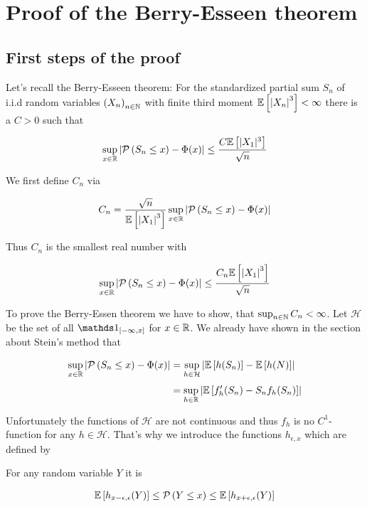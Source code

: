 \section{Proof of the Berry-Esseen theorem}

\subsection{First steps of the proof}

Let's recall the Berry-Esseen theorem: For the standardized partial sum $S_n$ of i.i.d random variables $\left({X_n}\right)_{{n}\in\mathbb N}$ with finite third moment $\mathbb E\left[{\left|{X_n}\right|^3}\right]<\infty$ there is a $C > 0$ such that

\begin{align}
  \sup_{x\in\mathbb R} \left|{\mathcal P\left({S_n\le x}\right)-\Phi(x)}\right| \le \frac{C \mathbb E\left[{|X_1|^3}\right]}{\sqrt n}
\end{align}

\noindent We first define $C_n$ via

\begin{align}
  C_n = \frac{\sqrt{n}}{\mathbb E\left[{\left|{X_1}\right|^3}\right]} \sup_{x\in\mathbb R} \left|{\mathcal P\left({S_n \le x}\right)-\Phi(x)}\right|
\end{align}

\noindent Thus $C_n$ is the smallest real number with

\begin{align}
  \sup_{x\in\mathbb R}\left|{\mathcal P\left({S_n\le x}\right) - \Phi(x)}\right| \le \frac{C_n\mathbb E\left[{\left|{X_1}\right|^3}\right]}{\sqrt{n}}
\end{align}

To prove the Berry-Essen theorem we have to show, that $\sup_{n\in\mathbb N} C_n < \infty$. Let $\mathcal H$ be the set of all $\cfs{x}$ for $x\in\mathbb R$. We already have shown in the section about Stein's method that

\begin{align}
  \sup_{x\in\R}\abs{\P{S_n\le x} - \Phi(x)} & = \sup_{h\in\mathcal H} \abs{\E{h(S_n)}-\E{h(N)}} \nl
  &= \sup_{h\in\R} \abs{\E{f_h'(S_n)-S_n f_h(S_n)}}
\end{align}

Unfortunately the functions of $\mathcal H$ are not continuous and thus $f_h$ is no $C^1$-function for any $h\in \mathcal H$. That's why we introduce the functions $h_{\epsilon,x}$ which are defined by


\noindent For any random variable $Y$ it is

\begin{align} \label{berryproof:inequality1}
  \mathbb E\left[{h_{x-\epsilon,\epsilon}(Y)}\right] \le \mathcal P\left({Y \le x}\right) \le \mathbb E\left[{h_{x+\epsilon,\epsilon}(Y)}\right]
\end{align}

